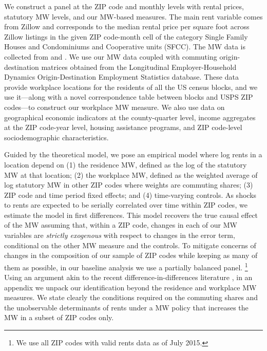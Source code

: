 We construct a panel at the ZIP code and monthly levels with rental prices, 
statutory MW levels, and our MW-based measures.
The main rent variable comes from Zillow and corresponds to the median 
rental price per square foot across Zillow listings in the given ZIP 
code-month cell of the category Single Family Houses and Condominiums and 
Cooperative units (SFCC).
The MW data is collected from \textcite{VaghulZipperer2016} and 
\textcite{BerkeleyLaborCenter}.
We use our MW data coupled with commuting origin-destination matrices obtained 
from the Longitudinal Employer-Household Dynamics Origin-Destination Employment 
Statistics \parencite[LODES;][]{CensusLODES} database.
These data provide workplace locations for the residents of all the US census 
blocks, and we use it---along with a novel correspondence table between blocks 
and USPS ZIP codes---to construct our workplace MW measure.
We also use data on 
geographical economic indicators at the county-quarter level, 
income aggregates at the ZIP code-year level,
housing assistance programs, and 
ZIP code-level sociodemographic characteristics.


Guided by the theoretical model, we pose an empirical model where log rents in 
a location depend on
(1) the residence MW, defined as the log of the statutory MW at that location;
(2) the workplace MW, defined as the weighted average of log statutory MW in other 
ZIP codes where weights are commuting shares;
(3) ZIP code and time period fixed effects;
and 
(4) time-varying controls.
As shocks to rents are expected to be serially correlated over time within ZIP 
codes, we estimate the model in first differences.
This model recovers the true causal effect of the MW assuming that, 
within a ZIP code, changes in each of our MW variables are 
\textit{strictly exogenous} with respect to changes in the error 
term, conditional on the other MW measure and the controls.
To mitigate concerns of changes in the composition of our sample of ZIP codes 
while keeping as many of them as possible, in our baseline analysis we use a 
partially balanced panel.%
\footnote{We use all ZIP codes with valid rents data as of July 2015.}
Using an argument akin to the recent difference-in-differences literature
\parencite[e.g.,][]{CallawayEtAl2021}, 
in an appendix we unpack our identification beyond the residence and
workplace MW measures.
We state clearly the conditions required on the commuting shares and the 
unobservable determinants of rents under a MW policy that increases the MW in 
a subset of ZIP codes only.


